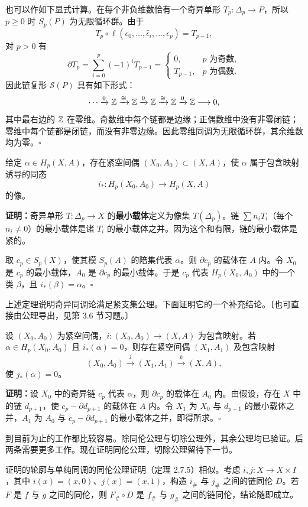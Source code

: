 也可以作如下显式计算。在每个非负维数恰有一个奇异单形 $T_p:\Delta_p\to P$，所以 $p\ge0$ 时 $S_p(P)$ 为无限循环群。由于
\[
T_p\circ\ell(\epsilon_0,\ldots,\widehat\epsilon_i,\ldots,\epsilon_p)=T_{p-1},
\]
对 $p>0$ 有
\[
\partial T_p=\sum_{i=0}^p(-1)^iT_{p-1}
=\begin{cases}0,&p\text{ 为奇数},\\T_{p-1},&p\text{ 为偶数}.\end{cases}
\]
因此链复形 $\mathcal S(P)$ 具有如下形式：
\[
\cdots\xrightarrow{0}\mathbb{Z}\xrightarrow{\cong}\mathbb{Z}\xrightarrow{0}\mathbb{Z}\xrightarrow{\cong}\mathbb{Z}\xrightarrow{0}\mathbb{Z}\longrightarrow0,
\]
其中最右边的 $\mathbb{Z}$ 在零维。奇数维中每个链都是边缘；正偶数维中没有非零闭链；零维中每个链都是闭链，而没有非零边缘。因此零维同调为无限循环群，其余维数均为零。\hfill$\square$

给定 $\alpha\in H_p(X,A)$，存在紧空间偶 $(X_0,A_0)\subset(X,A)$，使 $\alpha$ 属于包含映射诱导的同态
\[
i_*:H_p(X_0,A_0)\to H_p(X,A)
\]
的像。

\textbf{证明：}奇异单形 $T:\Delta_p\to X$ 的\textbf{最小载体}定义为像集 $T(\Delta_p)$。链 $\sum n_iT_i$（每个 $n_i\ne0$）的最小载体是诸 $T_i$ 的最小载体之并。因为这个和有限，链的最小载体是紧的。

取 $c_p\in S_p(X)$，使其模 $S_p(A)$ 的陪集代表 $\alpha$。则 $\partial c_p$ 的载体在 $A$ 内。令 $X_0$ 是 $c_p$ 的最小载体，$A_0$ 是 $\partial c_p$ 的最小载体。于是 $c_p$ 代表 $H_p(X_0,A_0)$ 中的一个类 $\beta$，且 $i_*(\beta)=\alpha$。\hfill$\square$

上述定理说明奇异同调论满足紧支集公理。下面证明它的一个补充结论。〔也可直接由公理导出，见第 3.6 节习题。〕

设 $(X_0,A_0)$ 为紧空间偶，$i:(X_0,A_0)\to(X,A)$ 为包含映射。若 $\alpha\in H_p(X_0,A_0)$ 且 $i_*(\alpha)=0$，则存在紧空间偶 $(X_1,A_1)$ 及包含映射
\[
(X_0,A_0)\xrightarrow{j}(X_1,A_1)\xrightarrow{k}(X,A),
\]
使 $j_*(\alpha)=0$。

\textbf{证明：}设 $X_0$ 中的奇异链 $c_p$ 代表 $\alpha$，则 $\partial c_p$ 的载体在 $A_0$ 内。由假设，存在 $X$ 中的链 $d_{p+1}$，使 $c_p-\partial d_{p+1}$ 的载体在 $A$ 内。令 $X_1$ 为 $X_0$ 与 $d_{p+1}$ 的最小载体之并，$A_1$ 为 $A_0$ 与 $c_p-\partial d_{p+1}$ 的最小载体之并，即得所求。\hfill$\square$

到目前为止的工作都比较容易。除同伦公理与切除公理外，其余公理均已验证。后两条需要更多工作。现在证明同伦公理，切除公理留待下一节。

证明的轮廓与单纯同调的同伦公理证明（定理 2.7.5）相似。考虑 $i,j:X\to X\times I$，其中 $i(x)=(x,0)$、$j(x)=(x,1)$，构造 $i_\#$ 与 $j_\#$ 之间的链同伦 $D$。若 $F$ 是 $f$ 与 $g$ 之间的同伦，则 $F_\#\circ D$ 是 $f_\#$ 与 $g_\#$ 之间的链同伦，结论随即成立。

